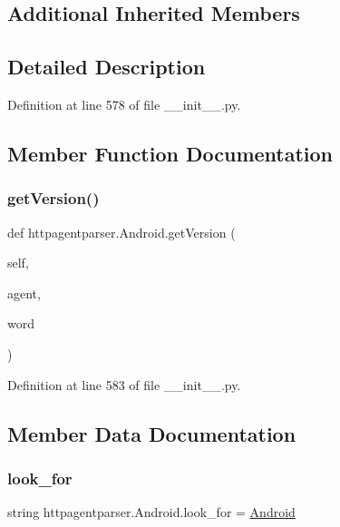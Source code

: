 \subsection*{Additional Inherited Members}


\subsection{Detailed Description}


Definition at line 578 of file \+\_\+\+\_\+init\+\_\+\+\_\+.\+py.



\subsection{Member Function Documentation}
\hypertarget{classhttpagentparser_1_1_android_a4bf3823189b36eae15473f8d5e3983c8}{}\label{classhttpagentparser_1_1_android_a4bf3823189b36eae15473f8d5e3983c8} 
\subsubsection{\texorpdfstring{get\+Version()}{getVersion()}}
{\footnotesize\ttfamily def httpagentparser.\+Android.\+get\+Version (\begin{DoxyParamCaption}\item[{}]{self,  }\item[{}]{agent,  }\item[{}]{word }\end{DoxyParamCaption})}



Definition at line 583 of file \+\_\+\+\_\+init\+\_\+\+\_\+.\+py.



\subsection{Member Data Documentation}
\hypertarget{classhttpagentparser_1_1_android_afc7fdd2a13c7b286ef7f5a92f8c490d3}{}\label{classhttpagentparser_1_1_android_afc7fdd2a13c7b286ef7f5a92f8c490d3} 
\subsubsection{\texorpdfstring{look\+\_\+for}{look\_for}}
{\footnotesize\ttfamily string httpagentparser.\+Android.\+look\+\_\+for = \textquotesingle{}\hyperlink{classhttpagentparser_1_1_android}{Android}\textquotesingle{}\hspace{0.3cm}{\ttfamily [static]}}



